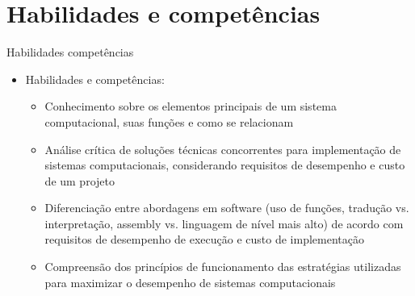     \section[slide=true]{Habilidades e competências}
      \begin{slide}[toc=]{Habilidades competências}
         \begin{itemize}
	     \item Habilidades e competências:
		     \begin{itemize}
			     \item Conhecimento sobre os elementos principais de um sistema computacional, suas funções e como se relacionam
			     \item Análise crítica de soluções técnicas concorrentes para implementação de sistemas computacionais, considerando requisitos de desempenho e custo de um projeto
			     \item Diferenciação entre abordagens em software (uso de funções, tradução vs. interpretação, assembly vs. linguagem de nível mais alto) de acordo com requisitos de desempenho de execução e custo de implementação
			     \item Compreensão dos princípios de funcionamento das estratégias utilizadas para maximizar o desempenho de sistemas computacionais
	            \end{itemize}
         \end{itemize}
      \end{slide}

